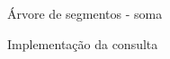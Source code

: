 \begin{frame}{Árvore de segmentos - soma}

    \begin{block}{Implementação da consulta}
        \footnotesize
        \inputminted{cpp}{codigos/consulta.cpp}    
    \end{block}

\end{frame}

